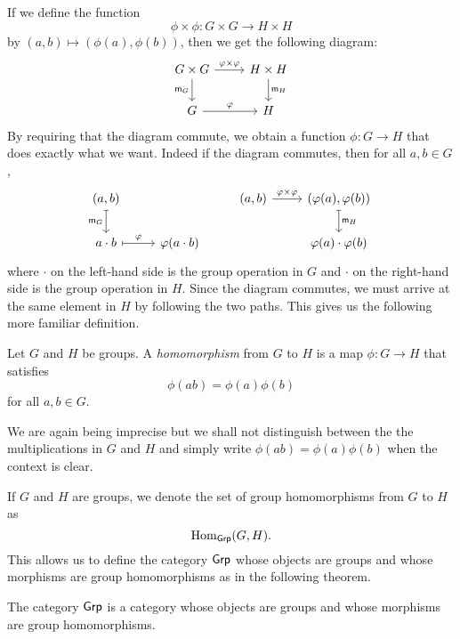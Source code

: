 If we define the function
\[
    \phi \times \phi: G \times G \to H \times H
\]
by \((a, b) \mapsto (\phi(a), \phi(b))\), then we get the following diagram:
\[
    \begin{tikzcd}
        G \times G \arrow{r}{\phi \times \phi} \arrow[swap]{d}{\mult_G} & H \times H \arrow{d}{\mult_H} \\
        G \arrow{r}{\phi} & H
    \end{tikzcd}
\]
By requiring that the diagram commute, we obtain a function \(\phi: G \to H\)
that does exactly what we want. Indeed if the diagram commutes, then for all
\(a, b \in G\),
\[
    \begin{tikzcd}
        (a, b) \arrow[swap, mapsto]{d}{\mult_G} & & (a, b) \arrow{r}{\phi \times \phi} & (\phi(a), \phi(b)) \arrow[mapsto]{d}{\mult_H} \\
        a\cdot b \arrow[mapsto]{r}{\phi} & \phi(a\cdot b) && \phi(a)\cdot\phi(b)
    \end{tikzcd}
\]
where \(\cdot\) on the left-hand side is the group operation in \(G\) and
\(\cdot\) on the right-hand side is the group operation in \(H\). Since the
diagram commutes, we must arrive at the same element in \(H\) by following the
two paths. This gives us the following more familiar definition.


\begin{definition}
    Let \(G\) and \(H\) be groups. A \emph{homomorphism} from \(G\) to \(H\) is
    a map \(\phi: G \to H\) that satisfies
    \[
        \phi(ab) = \phi(a)\phi(b)
    \]
    for all \(a, b \in G\).
\end{definition}

We are again being imprecise but we shall not distinguish between the the
multiplications in \(G\) and \(H\) and simply write \(\phi(ab) =
\phi(a)\phi(b)\) when the context is clear.

\begin{definition}
    If \(G\) and \(H\) are groups, we denote the set of group homomorphisms from
    \(G\) to \(H\) as
    \[
        \operatorname{Hom}_{\mathsf{Grp}}(G, H).
    \]
    This allows us to define the category \(\mathsf{Grp}\) whose objects are groups and
    whose morphisms are group homomorphisms as in the following theorem.
\end{definition}

\begin{theorem}
    The category \(\mathsf{Grp}\) is a category whose objects are groups and whose
    morphisms are group homomorphisms.
\end{theorem}

